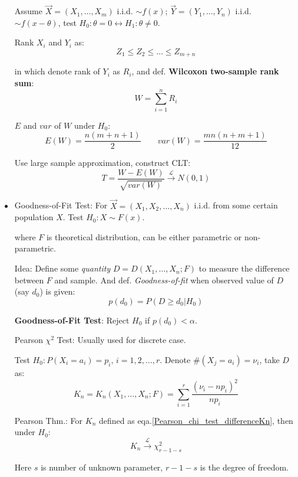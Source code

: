 \documentclass[11pt,a4paper]{ctexart}
\numberwithin{equation}{section}%
\begin{document}
\begin{itemize}
        Assume $\vec{X}=(X_1,\ldots,X_m)$ i.i.d. $\sim f(x)$; $\vec{Y}=(Y_1,\ldots,Y_n)$ i.i.d. $\sim f(x-\theta)$, test $H_0:\theta=0\longleftrightarrow H_1:\theta\neq 0$.

        Rank $X_i$ and $Y_i$ as:
        \[
            Z_1\leq Z_2\leq\ldots\leq Z_{m+n}
        \]

        in which denote rank of $Y_i$ as $R_i$, and def. \textbf{Wilcoxon two-sample rank sum}:
        \[W=\sum_{i=1}^n R_i\]

        $E$ and $var$ of $W$ under $H_0$:
\[E(W)=\frac{n(m+n+1)}{2}\qquad var(W)=\frac{mn(n+m+1)}{12}\]

        Use large sample approximation, construct CLT:
        \[
            T=\frac{W-E(W)}{\sqrt{var(W)}}\xrightarrow[]{\mathscr{L}}N(0,1)
        \]







        \item Goodness-of-Fit Test: For $\vec{X}=(X_1,X_2,\ldots,X_n)$ i.i.d. from some certain population $X$. Test $H_0:X\sim F(x)$.
        
        where $F$ is theoretical distribution, can be either parametric or non-parametric.

        Idea: Define some \textit{quantity} $D=D(X_1,\ldots,X_n;F)$ to measure the difference between $F$ and sample. And def. \textit{Goodness-of-fit} when observed value of $D$ (say $d_0$) is given:
        \[p(d_0)=P(D\geq d_0|H_0)\]

        \textbf{Goodness-of-Fit Test}: Reject $H_0$ if $p(d_0)<\alpha$.


            Pearson $\chi^2$ Test: Usually used for discrete case. 
            
            Test $H_0:P(X_i=a_i)=p_i,\, i=1,2,\ldots,r$. Denote $\#(X_j=a_i)=\nu_i$, take $D$ as:
            \begin{equation}\label{Pearson_chi_test_differenceKn}
                K_n=K_n(X_1,\ldots,X_n;F)=\sum_{i=1}^r\frac{(\nu_i-np_i)^2}{np_i}
            \end{equation}

            Pearson Thm.: For $K_n$ defined as eqa.\ref{Pearson_chi_test_differenceKn}, then under $H_0$:
            \[
                K_n\xrightarrow[]{\mathscr{L}}\chi^2_{r-1-s}
            \] 

            Here $s$ is number of unknown parameter, $r-1-s$ is the degree of freedom.


\end{itemize}
\end{document}
